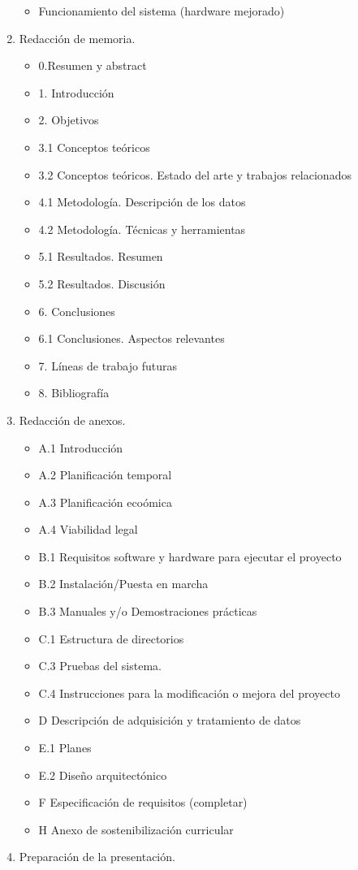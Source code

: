\begin{enumerate}
\begin{itemize}
        \item Funcionamiento del sistema (hardware mejorado)
    \end{itemize}
    \item Redacción de memoria.
    \begin{itemize}
        \item 0.Resumen y abstract
        \item 1. Introducción
        \item 2. Objetivos
        \item 3.1 Conceptos teóricos
        \item 3.2 Conceptos teóricos. Estado del arte y trabajos relacionados
        \item 4.1 Metodología. Descripción de los datos
        \item 4.2 Metodología. Técnicas y herramientas
        \item 5.1 Resultados. Resumen
        \item 5.2 Resultados. Discusión
        \item 6. Conclusiones
        \item 6.1 Conclusiones. Aspectos relevantes
        \item 7. Líneas de trabajo futuras
        \item 8. Bibliografía
    \end{itemize}
    \item Redacción de anexos.
    \begin{itemize}
        \item A.1 Introducción
        \item A.2 Planificación temporal
        \item A.3 Planificación ecoómica
        \item A.4 Viabilidad legal
        \item B.1 Requisitos software y hardware para ejecutar el proyecto
        \item B.2 Instalación/Puesta en marcha
        \item B.3 Manuales y/o Demostraciones prácticas
        \item C.1 Estructura de directorios
        \item C.3 Pruebas del sistema.
        \item C.4 Instrucciones para la modificación o mejora del proyecto
        \item D Descripción de adquisición y tratamiento de datos
        \item E.1 Planes
        \item E.2 Diseño arquitectónico
        \item F Especificación de requisitos (completar)
        \item H Anexo de sostenibilización curricular
    \end{itemize}
    \item Preparación de la presentación.
\end{enumerate}

